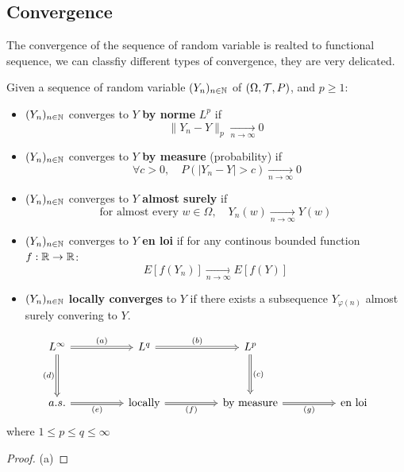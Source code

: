 \documentclass[en,geye,blue,normal,12pt,bibend=bibtex]{elegantnote}
\begin{document}
\subsection{Convergence}
The convergence of the sequence of random variable is realted to functional sequence, we can classfiy different types of convergence, they are very delicated.

\begin{definition}
    Given a sequence of random variable \((Y_n)_{n \in \mathbb{N}}\) of \((\Omega ,\mathcal{T} ,P)\), and \(p \geq 1\):
    \begin{itemize}
        \item \((Y_n)_{n \in \mathbb{N}}\) converges to \(Y\) \textbf{by norme} \(L^p\) if \[\|Y_n-Y\|_p \xrightarrow[n \rightarrow \infty]{} 0\]
        \item \((Y_n)_{n \in \mathbb{N}}\) converges to \(Y\) \textbf{by measure} (probability) if \[\ \forall c>0, \quad P(|Y_n-Y|>c) \xrightarrow[n \rightarrow \infty]{} 0 \]
        \item \((Y_n)_{n \in \mathbb{N}}\) converges to \(Y\) \textbf{almost surely} if \[ \text{for almost every } w \in \Omega, \quad Y_n(w) \xrightarrow[n \rightarrow \infty]{} Y(w)\]
        \item \((Y_n)_{n \in \mathbb{N}}\) converges to \(Y\) \textbf{en loi} if for any continous bounded function \(f: \mathbb{R} \to \mathbb{R}\): \[E[f(Y_n)] \xrightarrow[n \rightarrow \infty]{} E[f(Y)] \]
        \item \((Y_n)_{n \in \mathbb{N}}\)  \textbf{locally converges} to \(Y\) if there exists a subsequence \(Y_{\varphi(n)}\) almost surely convering to \(Y\).     
    \end{itemize}
\end{definition}

\begin{proposition}
\[
\begin{tikzcd}
    {L^\infty} && {L^q} && {L^p} \\
    \\
    {a.s.} && {\text{locally}} && {\text{by measure}} && {\text{en loi}}
    \arrow[Rightarrow, "{(a)}", from=1-1, to=1-3]
    \arrow[Rightarrow, "{(d)}"', from=1-1, to=3-1]
    \arrow[Rightarrow, "{(b)}", from=1-3, to=1-5]
    \arrow[Rightarrow, "{(c)}", from=1-5, to=3-5]
    \arrow[Rightarrow, "{(e)}"', from=3-1, to=3-3]
    \arrow[Rightarrow, "{(f)}"', from=3-3, to=3-5]
    \arrow[Rightarrow, "{(g)}"', from=3-5, to=3-7]
\end{tikzcd}
\] where \(1 \leq p \leq q \leq \infty\) 

\begin{proof}
    (a) 
\end{proof}
\end{proposition}
\end{document}
